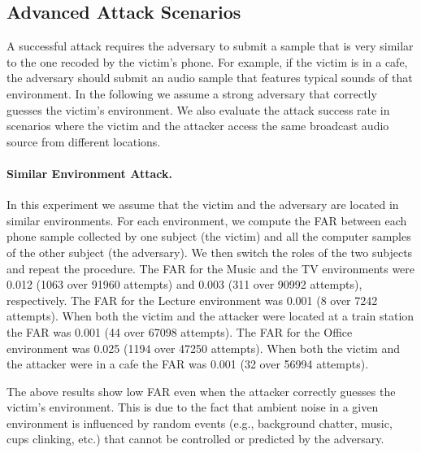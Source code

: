 \subsection{Advanced Attack Scenarios}
\label{sec:ps_sp_far}
A successful attack requires the adversary to submit a sample that is very similar to the one recoded by the victim's phone.
For example, if the victim is in a cafe, the adversary should submit an audio sample that features typical sounds of that environment.
In the following we assume a strong adversary that correctly guesses the victim's environment.
We also evaluate the attack success rate in scenarios where the victim and the attacker access the same broadcast audio source from different locations.

\paragraph{Similar Environment Attack.}
In this experiment we assume that the victim and the adversary are located in similar environments.
For each environment, we compute the FAR between each phone sample collected by one subject (the victim) and all the computer samples of the other subject (the adversary). We then switch the roles of the two subjects and repeat the procedure.
The FAR  for the Music and the TV environments were 0.012 (1063 over 91960 attempts) and 0.003 (311 over 90992 attempts), respectively.
The FAR for the Lecture environment was  0.001 (8 over 7242 attempts).
When both the victim and the attacker were located at a train station the FAR was 0.001 (44 over 67098 attempts).
The FAR for the Office environment was 0.025 (1194 over 47250 attempts).
When both the victim and the attacker were in a cafe the FAR was 0.001 (32 over 56994 attempts).

The above results show low FAR even when the attacker correctly guesses the victim's environment.
This is due to the fact that ambient noise in a given environment is influenced by random events (e.g., background chatter, music, cups clinking, etc.) that cannot be controlled or predicted by the adversary.



%


